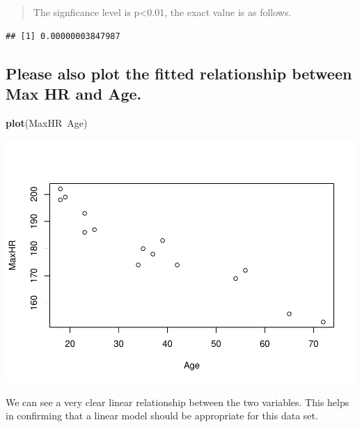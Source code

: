\documentclass[]{article}
\newenvironment{Shaded}{\begin{snugshade}}{\end{snugshade}}
\newcommand{\KeywordTok}[1]{\textcolor[rgb]{0.13,0.29,0.53}{\textbf{{#1}}}}
\newcommand{\DataTypeTok}[1]{\textcolor[rgb]{0.13,0.29,0.53}{{#1}}}
\newcommand{\DecValTok}[1]{\textcolor[rgb]{0.00,0.00,0.81}{{#1}}}
\newcommand{\StringTok}[1]{\textcolor[rgb]{0.31,0.60,0.02}{{#1}}}
\newcommand{\NormalTok}[1]{{#1}}
\begin{document}
\begin{quote}
The signficance level is p\textless{}0.01, the exact value is as
follows.
\end{quote}

\begin{Shaded}
\end{Shaded}

\begin{verbatim}
## [1] 0.00000003847987
\end{verbatim}

\subsection{Please also plot the fitted relationship between Max HR and
Age.}\label{please-also-plot-the-fitted-relationship-between-max-hr-and-age.}

\begin{Shaded}
\begin{Highlighting}[]
\KeywordTok{plot}\NormalTok{(MaxHR~Age)}
\end{Highlighting}
\end{Shaded}

\includegraphics{CHunt_Assign11_files/figure-latex/unnamed-chunk-4-1.pdf}

We can see a very clear linear relationship between the two variables.
This helps in confirming that a linear model should be appropriate for
this data set.
\end{document}
